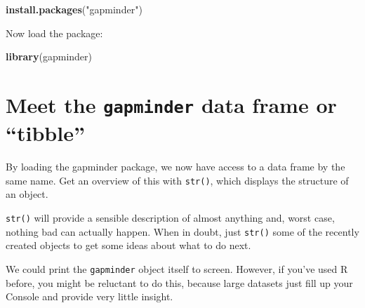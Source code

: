 \documentclass[
]{book}
\newenvironment{Shaded}{\begin{snugshade}}{\end{snugshade}}
\newcommand{\CommentTok}[1]{\textcolor[rgb]{0.56,0.35,0.01}{\textit{#1}}}
\newcommand{\KeywordTok}[1]{\textcolor[rgb]{0.13,0.29,0.53}{\textbf{#1}}}
\newcommand{\NormalTok}[1]{#1}
\newcommand{\StringTok}[1]{\textcolor[rgb]{0.31,0.60,0.02}{#1}}
\begin{document}
\begin{Shaded}
\begin{Highlighting}[]
\KeywordTok{install.packages}\NormalTok{(}\StringTok{"gapminder"}\NormalTok{)}
\end{Highlighting}
\end{Shaded}

Now load the package:

\begin{Shaded}
\begin{Highlighting}[]
\KeywordTok{library}\NormalTok{(gapminder)}
\end{Highlighting}
\end{Shaded}

\hypertarget{meet-the-gapminder-data-frame-or-tibble}{%
\section{\texorpdfstring{Meet the \texttt{gapminder} data frame or ``tibble''}{Meet the gapminder data frame or ``tibble''}}\label{meet-the-gapminder-data-frame-or-tibble}}

By loading the gapminder package, we now have access to a data frame by the same name. Get an overview of this with \texttt{str()}, which displays the structure of an object.

\begin{Shaded}
\end{Shaded}

\texttt{str()} will provide a sensible description of almost anything and, worst case, nothing bad can actually happen. When in doubt, just \texttt{str()} some of the recently created objects to get some ideas about what to do next.

We could print the \texttt{gapminder} object itself to screen. However, if you've used R before, you might be reluctant to do this, because large datasets just fill up your Console and provide very little insight.
\end{document}
